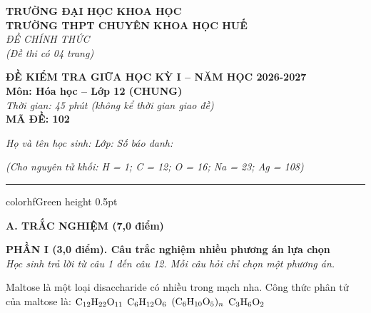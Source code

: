 \documentclass[11pt,a4paper]{article}
\begin{document}
\begin{minipage}[t]{0.48\textwidth}
\textbf{TRƯỜNG ĐẠI HỌC KHOA HỌC}\\
\textbf{TRƯỜNG THPT CHUYÊN KHOA HỌC HUẾ}\\
\textit{ĐỀ CHÍNH THỨC}\\
\textit{(Đề thi có 04 trang)}
\end{minipage}
\hfill
\begin{minipage}[t]{0.48\textwidth}
\raggedleft
\textbf{\color{hfRed}ĐỀ KIỂM TRA GIỮA HỌC KỲ I -- NĂM HỌC 2026-2027}\\
\textbf{Môn: Hóa học -- Lớp 12 (CHUNG)}\\
\textit{Thời gian: 45 phút (không kể thời gian giao đề)}\\
\textbf{MÃ ĐỀ: 102}
\end{minipage}

\vspace{4pt}
\noindent
\textit{Họ và tên học sinh:} \dotfill \textit{Lớp:} \dotfill \textit{Số báo danh:} \dotfill

\vspace{3pt}
\noindent
\textit{\footnotesize (Cho nguyên tử khối: H = 1; C = 12; O = 16; Na = 23; Ag = 108)}

\vspace{3pt}
\hrule color{hfGreen} height 0.5pt


\vspace{4pt}
\noindent
{\color{mainGreen}\textbf{\Large A. TRẮC NGHIỆM (7,0 điểm)}}

\vspace{3pt}
\noindent
{\color{mainGreen}\textbf{\large PHẦN I (3,0 điểm). Câu trắc nghiệm nhiều phương án lựa chọn}}\\
\textit{\small Học sinh trả lời từ câu 1 đến câu 12. Mỗi câu hỏi chỉ chọn một phương án.}
\vspace{2pt}


\begin{ex}
Maltose là một loại disaccharide có nhiều trong mạch nha. Công thức phân tử của maltose là:
\choice
{\True $\ce{C12H22O11}$}
{$\ce{C6H12O6}$}
{$(\ce{C6H10O5})_n$}
{$\ce{C3H6O2}$}

\end{ex}
\end{document}
